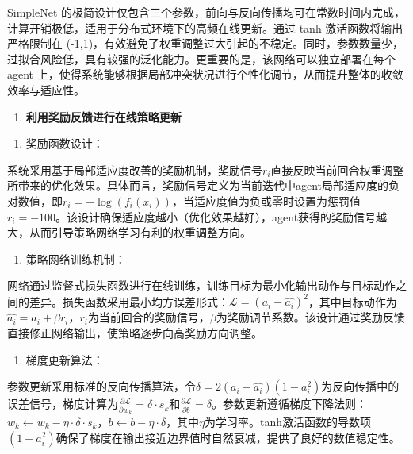 \documentclass[12pt]{ctexart}
\begin{document}
SimpleNet
的极简设计仅包含三个参数，前向与反向传播均可在常数时间内完成，计算开销极低，适用于分布式环境下的高频在线更新。通过
tanh 激活函数将输出严格限制在
(-1,1)，有效避免了权重调整过大引起的不稳定。同时，参数数量少，过拟合风险低，具有较强的泛化能力。更重要的是，该网络可以独立部署在每个
agent
上，使得系统能够根据局部冲突状况进行个性化调节，从而提升整体的收敛效率与适应性。

\begin{enumerate}
\def\labelenumi{(\arabic{enumi})}
\setcounter{enumi}{1}
\item
  \textbf{利用奖励反馈进行在线策略更新}
\end{enumerate}

\begin{enumerate}
\def\labelenumi{\alph{enumi})}
\item
  奖励函数设计：
\end{enumerate}

系统采用基于局部适应度改善的奖励机制，奖励信号\(r_{i}\)直接反映当前回合权重调整所带来的优化效果。具体而言，奖励信号定义为当前迭代中agent局部适应度的负对数值，即\(r_{i} = - \log\left( f_{i}\left( x_{i} \right) \right)\)，当适应度值为负或零时设置为惩罚值\(r_{i} = - 100\)。该设计确保适应度越小（优化效果越好），agent获得的奖励信号越大，从而引导策略网络学习有利的权重调整方向。

\begin{enumerate}
\def\labelenumi{\alph{enumi})}
\setcounter{enumi}{1}
\item
  策略网络训练机制：
\end{enumerate}

网络通过监督式损失函数进行在线训练，训练目标为最小化输出动作与目标动作之间的差异。损失函数采用最小均方误差形式：\(\mathcal{L} = \left( a_{i} - \widehat{a_{i}} \right)^{2}\)，其中目标动作为\(\widehat{a_{i}} = a_{i} + \beta r_{i}\)，\(r_{i}\)为当前回合的奖励信号，\(\beta\)为奖励调节系数。该设计通过奖励反馈直接修正网络输出，使策略逐步向高奖励方向调整。

\begin{enumerate}
\def\labelenumi{\alph{enumi})}
\setcounter{enumi}{2}
\item
  梯度更新算法：
\end{enumerate}

参数更新采用标准的反向传播算法，令\(\delta = 2\left( a_{i} - \widehat{a_{i}} \right)\left( 1 - a_{i}^{2} \right)\)为反向传播中的误差信号，梯度计算为\(\frac{\partial\mathcal{L}}{\partial w_{k}} = \delta \cdot s_{k}\)和\(\frac{\partial\mathcal{L}}{\partial b} = \delta\)。参数更新遵循梯度下降法则：\(w_{k} \leftarrow w_{k} - \eta \cdot \delta \cdot s_{k}\)，\(b \leftarrow b - \eta \cdot \delta\)，其中\(\eta\)为学习率。tanh激活函数的导数项\(\left( 1 - a_{i}^{2} \right)\)确保了梯度在输出接近边界值时自然衰减，提供了良好的数值稳定性。
\end{document}
